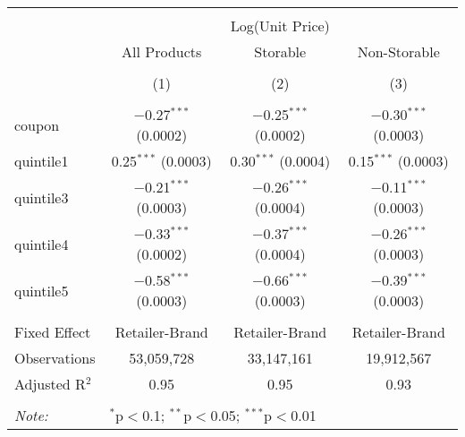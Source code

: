 
\begin{table}[!htbp] \centering 
  \caption{} 
  \label{tab:overallSavings} 
\begin{tabular}{@{\extracolsep{5pt}}lccc} 
\\[-1.8ex]\hline 
\hline \\[-1.8ex] 
 & \multicolumn{3}{c}{Log(Unit Price)} \\ 
\cline{2-4} 
 & All Products & Storable & Non-Storable \\ 
\\[-1.8ex] & (1) & (2) & (3)\\ 
\hline \\[-1.8ex] 
 coupon & $-$0.27$^{***}$ (0.0002) & $-$0.25$^{***}$ (0.0002) & $-$0.30$^{***}$ (0.0003) \\ 
  quintile1 & 0.25$^{***}$ (0.0003) & 0.30$^{***}$ (0.0004) & 0.15$^{***}$ (0.0003) \\ 
  quintile3 & $-$0.21$^{***}$ (0.0003) & $-$0.26$^{***}$ (0.0004) & $-$0.11$^{***}$ (0.0003) \\ 
  quintile4 & $-$0.33$^{***}$ (0.0002) & $-$0.37$^{***}$ (0.0004) & $-$0.26$^{***}$ (0.0003) \\ 
  quintile5 & $-$0.58$^{***}$ (0.0003) & $-$0.66$^{***}$ (0.0003) & $-$0.39$^{***}$ (0.0003) \\ 
 \hline \\[-1.8ex] 
Fixed Effect & Retailer-Brand & Retailer-Brand & Retailer-Brand \\ 
Observations & 53,059,728 & 33,147,161 & 19,912,567 \\ 
Adjusted R$^{2}$ & 0.95 & 0.95 & 0.93 \\ 
\hline 
\hline \\[-1.8ex] 
\textit{Note:}  & \multicolumn{3}{l}{$^{*}$p$<$0.1; $^{**}$p$<$0.05; $^{***}$p$<$0.01} \\ 
\end{tabular} 
\end{table} 
